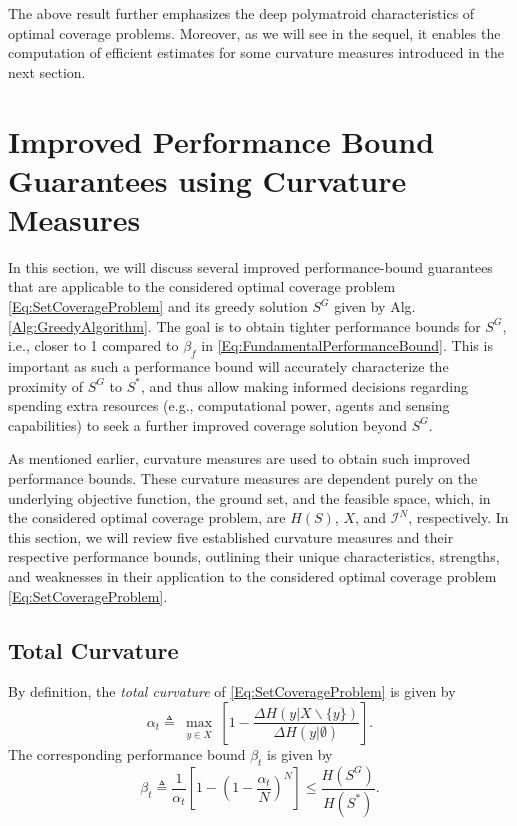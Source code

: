 \documentclass[letterpaper, 10 pt, conference]{ieeeconf}
\begin{document}
The above result further emphasizes the deep polymatroid characteristics of optimal coverage problems. Moreover, as we will see in the sequel, it enables the computation of efficient estimates for some curvature measures introduced in the next section.


\section{Improved Performance Bound Guarantees using Curvature Measures}
\label{Sec:CurvatureMeasures}

In this section, we will discuss several improved performance-bound guarantees that are applicable to the considered optimal coverage problem \eqref{Eq:SetCoverageProblem} and its greedy solution $S^G$ given by Alg. \ref{Alg:GreedyAlgorithm}. The goal is to obtain tighter performance bounds for $S^G$, i.e., closer to 1 compared to $\beta_f$ in \eqref{Eq:FundamentalPerformanceBound}. This is important as such a performance bound will accurately characterize the proximity of $S^G$ to $S^*$, and thus allow making informed decisions regarding spending extra resources (e.g., computational power, agents and sensing capabilities) to seek a further improved coverage solution beyond $S^G$. 


As mentioned earlier, curvature measures are used to obtain such improved performance bounds. These curvature measures are dependent purely on the underlying objective function, the ground set, and the feasible space, which, in the considered optimal coverage problem, are $H(S)$, $X$, and $\mathcal{I}^N$, respectively. In this section, we will review five established curvature measures and their respective performance bounds, outlining their unique characteristics, strengths, and weaknesses in their application to the considered optimal coverage problem \eqref{Eq:SetCoverageProblem}. 


\subsection{Total Curvature \cite{Conforti1984}}
\label{SubSec:TotalCurvature}

By definition, the \emph{total curvature} of \eqref{Eq:SetCoverageProblem} is given by  
\begin{equation}\label{Eq:TotalCurvatureCoefficientTheory}
    \alpha_t \triangleq \max_{\substack{y \in X} }\left[1 - \frac{\Delta H(y \vert X \backslash \{y\})}{\Delta H(y \vert \emptyset)}\right].
\end{equation}
The corresponding performance bound $\beta_t$ is given by
\begin{equation}\label{Eq:TotalCurvatureBoundTheory}
    \beta_t \triangleq \frac{1}{\alpha_t} \left[ 1 - \left( 1 -\frac{\alpha_t}{N} \right)^N \right] \leq \frac{H(S^G)}{H(S^*)}.
\end{equation}
\end{document}

